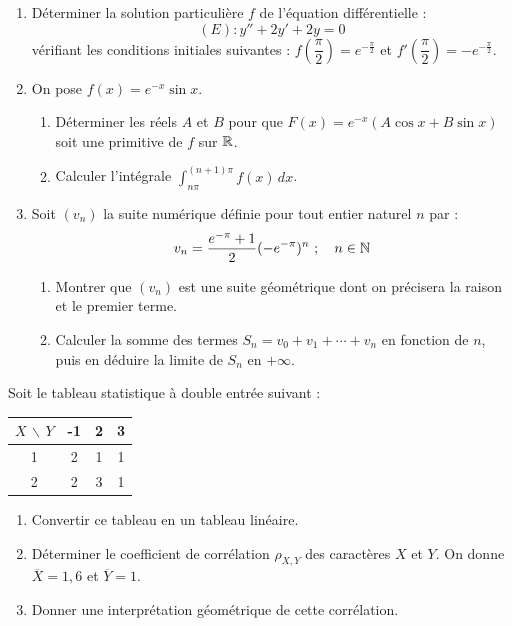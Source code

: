 \documentclass[11pt]{article}
\begin{document}
\begin{enumerate}
  \item Déterminer la solution particulière $f$ de l'équation différentielle :
  \[ (E) : y'' + 2y' + 2y = 0 \]
  vérifiant les conditions initiales suivantes : $f\!\left(\dfrac{\pi}{2}\right) = e^{-\frac{\pi}{2}}$ et $f'\!\left(\dfrac{\pi}{2}\right) = -e^{-\frac{\pi}{2}}$.
  \item On pose $f(x) = e^{-x}\sin x$.
  \begin{enumerate}[label=\alph*.]
    \item Déterminer les réels $A$ et $B$ pour que $F(x) = e^{-x}(A\cos x + B\sin x)$ soit une primitive de $f$ sur $\mathbb{R}$.
    \item Calculer l'intégrale $\displaystyle\int_{n\pi}^{(n+1)\pi} f(x)\,dx$.
  \end{enumerate}
  \item Soit $(v_n)$ la suite numérique définie pour tout entier naturel $n$ par :
  \[ v_n = \frac{e^{-\pi} + 1}{2}(-e^{-\pi})^n\ ;\quad n \in \mathbb{N} \]
  \begin{enumerate}[label=\alph*.]
    \item Montrer que $(v_n)$ est une suite géométrique dont on précisera la raison et le premier terme.
    \item Calculer la somme des termes $S_n = v_0 + v_1 + \cdots + v_n$ en fonction de $n$, puis en déduire la limite de $S_n$ en $+\infty$.
  \end{enumerate}
\end{enumerate}


Soit le tableau statistique à double entrée suivant :

\begin{center}
\renewcommand{\arraystretch}{1.3}
\begin{tabular}{|c|c|c|c|}
\hline
$X\,\backslash\,Y$ & -1 & 2 & 3 \\
\hline
1 & 2 & 1 & 1 \\
\hline
2 & 2 & 3 & 1 \\
\hline
\end{tabular}
\end{center}

\begin{enumerate}
  \item Convertir ce tableau en un tableau linéaire.
  \item Déterminer le coefficient de corrélation $\rho_{X,Y}$ des caractères $X$ et $Y$. On donne $\overline{X} = 1{,}6$ et $\overline{Y} = 1$.
  \item Donner une interprétation géométrique de cette corrélation.
\end{enumerate}
\end{document}
